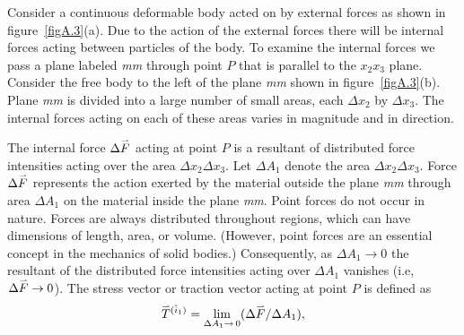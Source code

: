 \documentclass{AeroStructure-ERJohnson}
\def\harp#1{\smash{\mathord{\buildrel{\lower3pt\hbox{$\scriptscriptstyle\rightharpoonup$}}\over{#1}}}}
\begin{document}

Consider a continuous deformable body acted on by external forces as shown in figure~\ref{figA.3}(a). Due to the action of the external forces there will be internal forces acting between particles of the body. To examine the internal forces we pass a plane labeled \textit{mm} through point $P$ that is parallel to the $x_{2} x_{3}$ plane. Consider the free body to the left of the plane \textit{mm} shown in figure~\ref{figA.3}(b). Plane \textit{mm} is divided into a large number of small areas, each $\Delta x_{2}$ by $\Delta x_{3}$. The internal forces acting on each of these areas varies in magnitude and in direction.

 The internal force $\Delta \harp{F}$ acting at point $P$ is a resultant of distributed force intensities acting over the area $\Delta x_{2} \Delta x_{3}$. Let $\Delta A_{1}$ denote the area $\Delta x_{2} \Delta x_{3}$. Force $\Delta \harp{F}$ represents the action exerted by the material outside the plane \textit{mm} through area $\Delta A_{1}$ on the material inside the plane \textit{mm}. Point forces do not occur in nature. Forces are always distributed throughout regions, which can have dimensions of length, area, or volume. (However, point forces are an essential concept in the mechanics of solid bodies.) Consequently, as $\Delta A_{1} \rightarrow 0$ the resultant of the distributed force intensities acting over $\Delta A_{1}$ vanishes (i.e, $\Delta \harp{F} \rightarrow 0$). The stress vector or traction vector acting at point $P$ is defined as\vspace*{-9pt}
\begin{align}\label{eqA.67}
\harp{T}^{(\hat{i}_{1})}= \lim_{\Delta A_{1} \rightarrow\,0}(\Delta \harp{F} / \Delta A_{1}),
\end{align}

\vspace*{-1.2pc}
\end{document}
